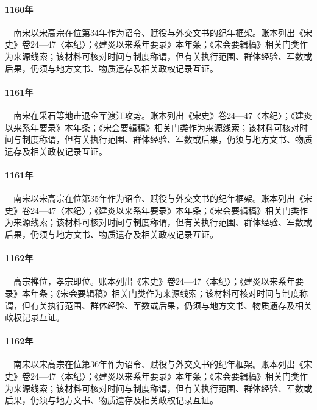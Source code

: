 \paragraph{1160年}　南宋以宋高宗在位第34年作为诏令、赋役与外交文书的纪年框架。账本列出《宋史》卷24—47〈本纪〉；《建炎以来系年要录》本年条；《宋会要辑稿》相关门类作为来源线索；该材料可核对时间与制度称谓，但有关执行范围、群体经验、军数或后果，仍须与地方文书、物质遗存及相关政权记录互证。

\paragraph{1161年}　南宋在采石等地击退金军渡江攻势。账本列出《宋史》卷24—47〈本纪〉；《建炎以来系年要录》本年条；《宋会要辑稿》相关门类作为来源线索；该材料可核对时间与制度称谓，但有关执行范围、群体经验、军数或后果，仍须与地方文书、物质遗存及相关政权记录互证。

\paragraph{1161年}　南宋以宋高宗在位第35年作为诏令、赋役与外交文书的纪年框架。账本列出《宋史》卷24—47〈本纪〉；《建炎以来系年要录》本年条；《宋会要辑稿》相关门类作为来源线索；该材料可核对时间与制度称谓，但有关执行范围、群体经验、军数或后果，仍须与地方文书、物质遗存及相关政权记录互证。

\paragraph{1162年}　高宗禅位，孝宗即位。账本列出《宋史》卷24—47〈本纪〉；《建炎以来系年要录》本年条；《宋会要辑稿》相关门类作为来源线索；该材料可核对时间与制度称谓，但有关执行范围、群体经验、军数或后果，仍须与地方文书、物质遗存及相关政权记录互证。

\paragraph{1162年}　南宋以宋高宗在位第36年作为诏令、赋役与外交文书的纪年框架。账本列出《宋史》卷24—47〈本纪〉；《建炎以来系年要录》本年条；《宋会要辑稿》相关门类作为来源线索；该材料可核对时间与制度称谓，但有关执行范围、群体经验、军数或后果，仍须与地方文书、物质遗存及相关政权记录互证。

